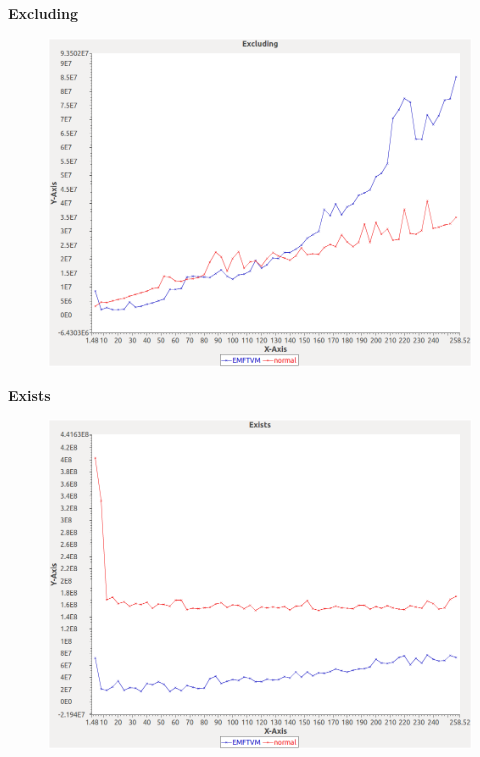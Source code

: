 \noindent\textbf{Excluding}

\begin{figure}[h]
\centering
\includegraphics[width=\textwidth]{../graphs/orderedset/Excluding}
\end{figure}
\pagebreak

\noindent\textbf{Exists}

\begin{figure}[h]
\centering
\includegraphics[width=\textwidth]{../graphs/orderedset/Exists}
\end{figure}
\pagebreak

